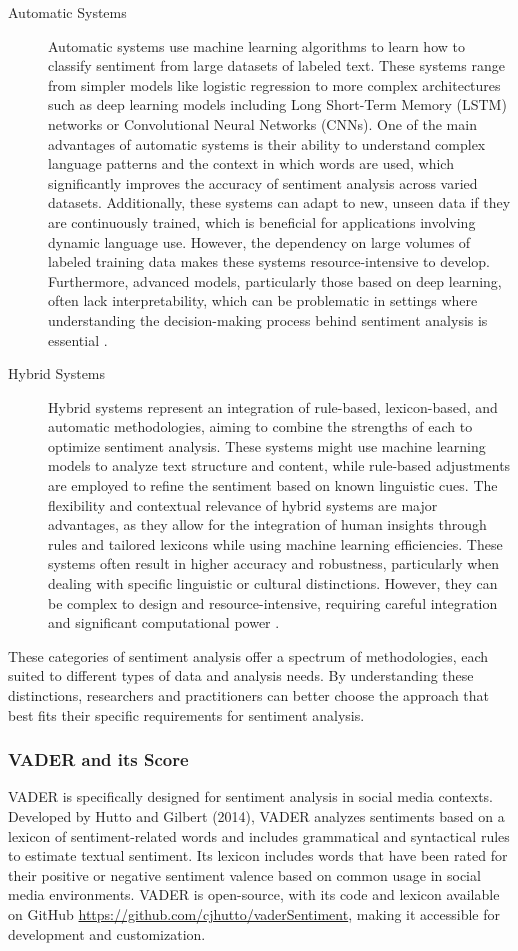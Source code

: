 \begin{description}
    \item[Automatic Systems] Automatic systems use machine learning algorithms to learn how to classify sentiment from large datasets of labeled text. These systems range from simpler models like logistic regression to more complex architectures such as deep learning models including Long Short-Term Memory (LSTM) networks or Convolutional Neural Networks (CNNs). One of the main advantages of automatic systems is their ability to understand complex language patterns and the context in which words are used, which significantly improves the accuracy of sentiment analysis across varied datasets. Additionally, these systems can adapt to new, unseen data if they are continuously trained, which is beneficial for applications involving dynamic language use. However, the dependency on large volumes of labeled training data makes these systems resource-intensive to develop. Furthermore, advanced models, particularly those based on deep learning, often lack interpretability, which can be problematic in settings where understanding the decision-making process behind sentiment analysis is essential \cite{yoonklim,pang2008opinion}.
    \item[Hybrid Systems] Hybrid systems represent an integration of rule-based, lexicon-based, and automatic methodologies, aiming to combine the strengths of each to optimize sentiment analysis. These systems might use machine learning models to analyze text structure and content, while rule-based adjustments are employed to refine the sentiment based on known linguistic cues. The flexibility and contextual relevance of hybrid systems are major advantages, as they allow for the integration of human insights through rules and tailored lexicons while using machine learning efficiencies. These systems often result in higher accuracy and robustness, particularly when dealing with specific linguistic or cultural distinctions. However, they can be complex to design and resource-intensive, requiring careful integration and significant computational power \cite{PORIA201650}.
\end{description}
These categories of sentiment analysis offer a spectrum of methodologies, each suited to different types of data and analysis needs. By understanding these distinctions, researchers and practitioners can better choose the approach that best fits their specific requirements for sentiment analysis.

\subsubsection{VADER and its Score}
VADER is specifically designed for sentiment analysis in social media contexts. Developed by Hutto and Gilbert (2014), VADER analyzes sentiments based on a lexicon of sentiment-related words and includes grammatical and syntactical rules to estimate textual sentiment. Its lexicon includes words that have been rated for their positive or negative sentiment valence based on common usage in social media environments. VADER is open-source, with its code and lexicon available on GitHub \url{https://github.com/cjhutto/vaderSentiment}, making it accessible for development and customization.

